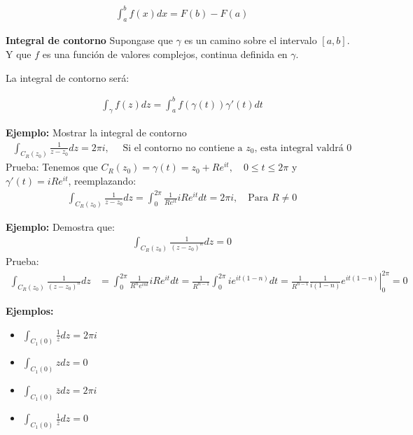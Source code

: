 \documentclass{article}
\newcommand{\caja}[3]{%
  \begin{tcolorbox}[colback=#1!5!white,colframe=#1!25!black,title=#2]
    #3
  \end{tcolorbox}%
}
\begin{document}
\caja{green}{Teorema fundamental del calculo }{
  \begin{gather*}
    \displaystyle\int_{a }^{b }f(x) dx = F(b) - F(a)  
  \end{gather*}
}

\textbf{Integral de contorno }
Supongase que $ \gamma $ es un camino sobre el intervalo $ [a,b ] $. Y que $ f  $ es una función de valores complejos, continua definida en $ \gamma $.

La integral de contorno será: 
\caja{red}{}{
  \begin{gather*}
    \displaystyle\int_{\gamma}^{}f(z)dz = \displaystyle\int_{a }^{b }f(\gamma(t))\gamma'(t) dt 
  \end{gather*}
}
\textbf{Ejemplo: } Mostrar la integral de contorno 
\begin{gather*}
  \displaystyle\int_{C_R(z_0 )}^{}\frac{1}{z-z_0 }dz = 2\pi i, \quad\text{ Si el contorno no contiene a }z_0 \text{, esta integral valdrá }0
\end{gather*}
Prueba: Tenemos que $ C_R(z_0 ) = \gamma(t) = z_0 + R e ^ {it }, \quad 0 \leq t \leq 2 \pi  $ y $ \gamma'(t) = iR e ^ {it } $, reemplazando: 
\begin{gather*}
   \displaystyle\int_{C_R(z_0 )}^{}\frac{1}{z-z_0 }dz = \displaystyle\int_{0 }^{2\pi } \frac{1}{Re ^ {it }}i R e ^ {it }dt = 2\pi i , \quad \text{Para }R\neq 0 
\end{gather*}

\textbf{Ejemplo: }Demostra que: 
\begin{gather*}
  \displaystyle\int_{C_R(z_0)}^{} \frac{1}{(z-z_0 )^n }dz = 0  
\end{gather*}
Prueba: 
\begin{align*}
  \displaystyle\int_{C_R(z_0 )}^{}\frac{1}{(z-z_0)^n }dz &= \displaystyle\int_{0 }^{2\pi } \frac{1}{R^n e ^ {int }}i R e ^ {it }dt = \frac{1}{R ^ {n-1 }}\displaystyle\int_{0 }^{2\pi } i e ^ {it(1-n )} dt = \left. \frac{1}{R ^ {n-1 }}\frac{1}{i(1-n) } e ^ {it(1-n)}\right| _{0 } ^ {2\pi } = 0 
\end{align*}

\textbf{Ejemplos: }
\begin{itemize}
  \item $ \displaystyle\int_{C_1(0)}^{}\frac{1}{z }dz = 2\pi i  $
  \item $ \displaystyle\int_{C_1(0)}^{}zdz = 0  $
  \item $ \displaystyle\int_{C_1(0)}^{} \bar z dz = 2\pi i  $
  \item $ \displaystyle\int_{C_1(0)}^{} \frac{1}{\bar z }dz = 0  $
\end{itemize}
\end{document}
